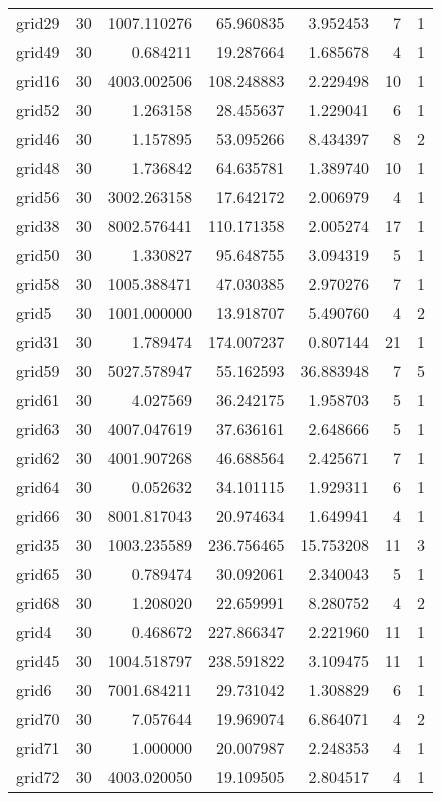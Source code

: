 \begin{longtable}{|l|r|r|r|r|r|r|}
grid29 & 30 & 1007.110276 & 65.960835 & 3.952453 & 7 & 1 \\
grid49 & 30 & 0.684211 & 19.287664 & 1.685678 & 4 & 1 \\
grid16 & 30 & 4003.002506 & 108.248883 & 2.229498 & 10 & 1 \\
grid52 & 30 & 1.263158 & 28.455637 & 1.229041 & 6 & 1 \\
grid46 & 30 & 1.157895 & 53.095266 & 8.434397 & 8 & 2 \\
grid48 & 30 & 1.736842 & 64.635781 & 1.389740 & 10 & 1 \\
grid56 & 30 & 3002.263158 & 17.642172 & 2.006979 & 4 & 1 \\
grid38 & 30 & 8002.576441 & 110.171358 & 2.005274 & 17 & 1 \\
grid50 & 30 & 1.330827 & 95.648755 & 3.094319 & 5 & 1 \\
grid58 & 30 & 1005.388471 & 47.030385 & 2.970276 & 7 & 1 \\
grid5 & 30 & 1001.000000 & 13.918707 & 5.490760 & 4 & 2 \\
grid31 & 30 & 1.789474 & 174.007237 & 0.807144 & 21 & 1 \\
grid59 & 30 & 5027.578947 & 55.162593 & 36.883948 & 7 & 5 \\
grid61 & 30 & 4.027569 & 36.242175 & 1.958703 & 5 & 1 \\
grid63 & 30 & 4007.047619 & 37.636161 & 2.648666 & 5 & 1 \\
grid62 & 30 & 4001.907268 & 46.688564 & 2.425671 & 7 & 1 \\
grid64 & 30 & 0.052632 & 34.101115 & 1.929311 & 6 & 1 \\
grid66 & 30 & 8001.817043 & 20.974634 & 1.649941 & 4 & 1 \\
grid35 & 30 & 1003.235589 & 236.756465 & 15.753208 & 11 & 3 \\
grid65 & 30 & 0.789474 & 30.092061 & 2.340043 & 5 & 1 \\
grid68 & 30 & 1.208020 & 22.659991 & 8.280752 & 4 & 2 \\
grid4 & 30 & 0.468672 & 227.866347 & 2.221960 & 11 & 1 \\
grid45 & 30 & 1004.518797 & 238.591822 & 3.109475 & 11 & 1 \\
grid6 & 30 & 7001.684211 & 29.731042 & 1.308829 & 6 & 1 \\
grid70 & 30 & 7.057644 & 19.969074 & 6.864071 & 4 & 2 \\
grid71 & 30 & 1.000000 & 20.007987 & 2.248353 & 4 & 1 \\
grid72 & 30 & 4003.020050 & 19.109505 & 2.804517 & 4 & 1 \\

\end{longtable}
